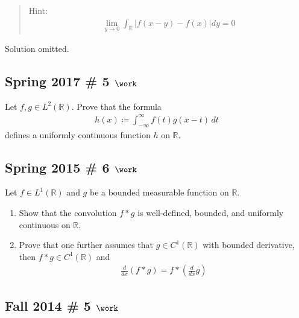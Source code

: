 \begin{quote}
Hint:
\begin{align*}
\lim _{y \to 0} \int _{{\mathbb{R}}} |f(x-y)-f(x)| dy = 0
\end{align*}
\end{quote}


Solution omitted.

\hypertarget{spring-2017-5-work}{%
\subsection{\texorpdfstring{Spring 2017 \# 5
\(\work\)}{Spring 2017 \# 5 \textbackslash work}}\label{spring-2017-5-work}}

Let \(f, g \in L^2({\mathbb{R}})\). Prove that the formula
\begin{align*}
h(x) \coloneqq\int _{-\infty}^{\infty} f(t) g(x-t) \, dt
\end{align*}
defines a uniformly continuous function \(h\) on \({\mathbb{R}}\).

\hypertarget{spring-2015-6-work}{%
\subsection{\texorpdfstring{Spring 2015 \# 6
\(\work\)}{Spring 2015 \# 6 \textbackslash work}}\label{spring-2015-6-work}}

Let \(f \in L^1({\mathbb{R}})\) and \(g\) be a bounded measurable
function on \({\mathbb{R}}\).

\begin{enumerate}
\def\labelenumi{\arabic{enumi}.}
\tightlist
\item
  Show that the convolution \(f\ast g\) is well-defined, bounded, and
  uniformly continuous on \({\mathbb{R}}\).
\item
  Prove that one further assumes that \(g \in C^1({\mathbb{R}})\) with
  bounded derivative, then \(f\ast g \in C^1({\mathbb{R}})\) and
  \begin{align*}
  \frac{d}{d x}(f * g)=f *\left(\frac{d}{d x} g\right)
  \end{align*}
\end{enumerate}

\hypertarget{fall-2014-5-work}{%
\subsection{\texorpdfstring{Fall 2014 \# 5
\(\work\)}{Fall 2014 \# 5 \textbackslash work}}\label{fall-2014-5-work}}

